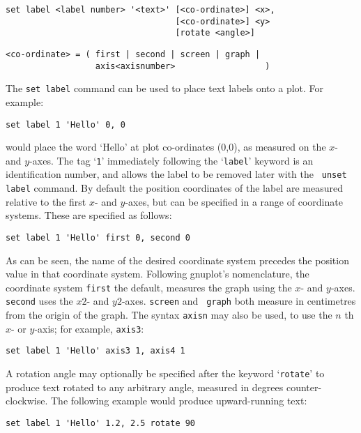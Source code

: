\documentclass[a4paper,onecolumn,11pt]{book}
\begin{document}
\begin{verbatim}
set label <label number> '<text>' [<co-ordinate>] <x>,
                                  [<co-ordinate>] <y>
                                  [rotate <angle>]
\end{verbatim}

\begin{verbatim}
<co-ordinate> = ( first | second | screen | graph |
                  axis<axisnumber>                  )
\end{verbatim}

The {\tt set label} command can be used to place text labels onto a plot.  For
example:

\begin{verbatim}
set label 1 'Hello' 0, 0
\end{verbatim}

\noindent would place the word `Hello' at plot co-ordinates (0,0), as measured on the $x$-
and $y$-axes.  The tag `{\tt 1}' immediately following the `{\tt label}' keyword is an
identification number, and allows the label to be removed later with the {\tt
unset label} command.  By default the position coordinates of the label are
measured relative to the first $x$- and $y$-axes, but can be specified in a
range of coordinate systems. These are specified as follows:

\begin{verbatim}
set label 1 'Hello' first 0, second 0
\end{verbatim}

As can be seen, the name of the desired coordinate system precedes the position
value in that coordinate system. Following gnuplot's nomenclature, the
coordinate system {\tt first} the default, measures the graph using the $x$- and
$y$-axes. {\tt second} uses the $x2$- and $y2$-axes.  {\tt screen} and {\tt
graph} both measure in centimetres from the origin of the graph.  The syntax
{\tt axisn} may also be used, to use the $n$ th $x$- or $y$-axis; for example,
{\tt axis3}:

\begin{verbatim}
set label 1 'Hello' axis3 1, axis4 1
\end{verbatim}

A rotation angle may optionally be specified after the keyword `{\tt rotate}'
to produce text rotated to any arbitrary angle, measured in degrees
counter-clockwise. The following example would produce upward-running text:

\begin{verbatim}
set label 1 'Hello' 1.2, 2.5 rotate 90
\end{verbatim}
\end{document}
